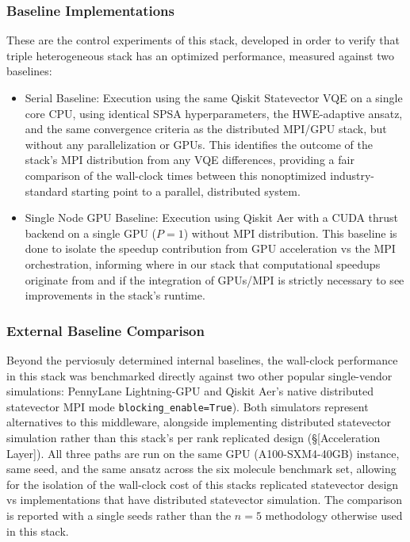\subsubsection{Baseline Implementations}
These are the control experiments of this stack, developed in order to verify that triple heterogeneous stack has an 
optimized performance, measured against two baselines: 
     \begin{itemize}
         \item Serial Baseline: Execution using the same Qiskit Statevector VQE on a single core CPU, using identical SPSA hyperparameters, the HWE-adaptive ansatz, and the same convergence criteria as the distributed MPI/GPU stack, but without any parallelization or GPUs. This identifies the outcome of the stack's MPI distribution from any VQE differences, providing a fair comparison of the wall-clock times between this nonoptimized industry-standard starting point to a parallel, distributed system.
         \item Single Node GPU Baseline: Execution using Qiskit Aer with a CUDA thrust backend on a single GPU ($P=1$) without MPI distribution. This baseline is done to isolate the speedup contribution from GPU acceleration vs the MPI orchestration, informing where in our stack that computational speedups originate from and if the integration of GPUs/MPI is strictly necessary to see improvements in the stack's runtime.
     \end{itemize}
 

\subsubsection{External Baseline Comparison}
Beyond the perviosuly determined internal baselines, the wall-clock performance in this stack was benchmarked directly against two other 
popular single-vendor simulations: PennyLane Lightning-GPU and Qiskit Aer's native distributed statevector MPI mode \texttt{blocking_enable=True}). Both simulators
represent alternatives to this middleware, alongside implementing distributed statevector simulation rather than this stack's per rank replicated design (\S[Acceleration Layer]). 
All three paths are run on the same GPU (A100-SXM4-40GB) instance, same seed, and the same ansatz across the six molecule benchmark set, allowing for the isolation 
of the wall-clock cost of this stacks replicated statevector design vs implementations that have distributed statevector simulation. 
The comparison is reported with a single seeds rather than the $n{=}5$ methodology otherwise used in this stack. 



